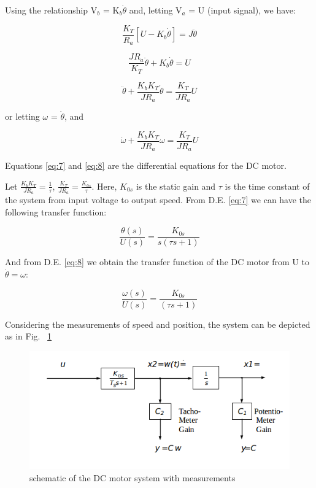\documentclass[11pt,a4paper]{article}
\begin{document}
Using the relationship V$_{b}$ = K$_{b}\dot{\theta}$ and, letting V$_{a}$ = U (input signal), we have:

\begin{equation} \label{eq:5}
\frac{K_{T}}{R_{a}}\left[U-K_{b}\dot{\theta}\right] = J\ddot{\theta}
\end{equation}

\begin{equation} \label{eq:6}
\frac{JR_{a}}{K_{T}}\ddot{\theta}+ K_{b}\dot{\theta} = U
\end{equation}

\begin{equation} \label{eq:7}
\ddot{\theta} + \frac{K_{b}K_{T}}{JR_{a}}\dot{\theta} = \frac{K_{T}}{JR_{a}}U
\end{equation}

or letting $\omega$ = $\dot{\theta}$, and 

\begin{equation} \label{eq:8}
\dot{\omega} + \frac{K_{b}K_{T}}{JR_{a}}\omega = \frac{K_{T}}{JR_{a}}U
\end{equation}

Equations \ref{eq:7} and \ref{eq:8} are the differential equations for the DC motor.

Let $\frac{K_{b}K_{T}}{JR_{a}} = \frac{1}{\tau}$, $\frac{K_{T}}{JR_{a}} = \frac{K_{0s}}{\tau}$. Here, $K_{0s}$ is the static gain and $\tau$ is the time constant of the system from input voltage to output speed. From D.E. \ref{eq:7} we can have the following transfer function:

\begin{equation} \label{eq:9}
\frac{\theta(s)}{U(s)} = \frac{K_{0s}}{s(\tau s + 1)}
\end{equation}

And from D.E. \ref{eq:8} we obtain the transfer function of the DC motor from U to $\dot{\theta}=\omega$:

\begin{equation} \label{eq:10}
\frac{\omega (s)}{U(s)} = \frac{K_{0s}}{(\tau s + 1)}
\end{equation}

Considering the measurements of speed and position, the system can be depicted as in Fig. ~\ref{fig:servomeasschem}

\begin{figure}[here]
\includegraphics[width=\textwidth]{imglab/servomeasurementschematic.png}
\caption{schematic of the DC motor system with measurements}
\label{fig:servomeasschem}
\end{figure}
\end{document}
